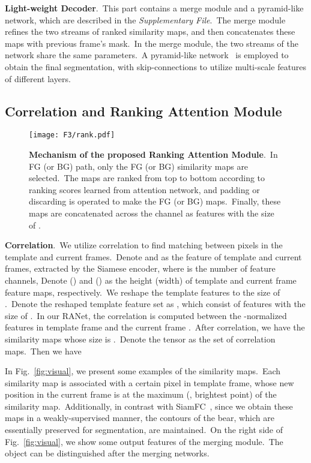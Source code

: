 \documentclass[10pt,twocolumn,letterpaper]{article}
\begin{document}
\noindent
\textbf{Light-weight Decoder}.\
This part contains a merge module and a pyramid-like network, which are described in the \textit{Supplementary File}.\ The merge module refines the two streams of ranked similarity maps, and then concatenates these maps with previous frame's mask.\ In the merge module, the two streams of the network share the same parameters.\ A pyramid-like network~\cite{u-net,refinenet,accv} is employed to obtain the final segmentation, with skip-connections to utilize multi-scale features of different layers.\ 




\subsection{Correlation and Ranking Attention Module}
\label{sec:ccsim}


\begin{figure}
\vspace{-5mm}
\begin{center}
\texttt{[image: F3/rank.pdf]}
\end{center}
\vspace{-7mm}
\caption{\textbf{Mechanism of the proposed Ranking Attention Module}.\ In FG (or BG) path, only the FG (or BG) similarity maps are selected.\ The maps are ranked from top to bottom according to ranking scores learned from attention network, and padding or discarding is operated to make the  FG (or BG) maps.\ Finally, these maps are concatenated across the channel as features with the size of .}
\label{fig:rank}
\vspace{-4mm}
\end{figure}


\noindent
\textbf{Correlation}.\ We utilize correlation to find matching between pixels in the template and current frames.\ Denote  and  as the feature of template and current frames, extracted by the Siamese encoder, where  is the number of feature channels, Denote  () and  () as the height (width) of template and current frame feature maps, respectively.\ 
We reshape the template features  to the size of .\ Denote the reshaped template feature set as , which consist of  features with the size of .\ 
In our RANet, the correlation is computed between the -normalized features  in template frame  and the current frame .\ After correlation, we have the similarity maps  whose size is .\
Denote the tensor  as the set of correlation maps.\ Then we have


In Fig.~\ref{fig:visual}, we present some examples of the similarity maps.\ Each similarity map is associated with a certain pixel in template frame, whose new position in the current frame is at the maximum (\ie, brightest point) of the similarity map.\ Additionally, in contrast with SiamFC~\cite{siamfc}, since we obtain these maps in a weakly-supervised manner, the contours of the bear, which are essentially preserved for segmentation, are maintained.\ On the right side of Fig.~\ref{fig:visual}, we show some output features of the merging module.\ The object can be distinguished after the merging networks.
\end{document}
